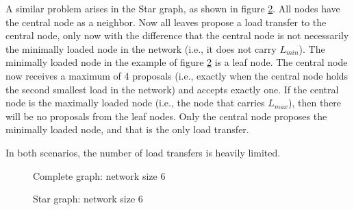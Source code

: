 A similar problem arises in the Star graph, as shown in figure \ref{fig:specialstargraphDemo}. All nodes have the central node as a neighbor. Now all leaves propose a load transfer to the central node, only now with the difference that the central node is not necessarily the minimally loaded node in the network (i.e., it does not carry $L_{min}$). The minimally loaded node in the example of figure \ref{fig:specialstargraphDemo} is a leaf node. The central node now receives a maximum of 4 proposals (i.e., exactly when the central node holds the second smallest load in the network) and accepts exactly one. If the central node is the maximally loaded node (i.e., the node that carries $L_{max}$), then there will be no proposals from the leaf nodes. Only the central node proposes the minimally loaded node, and that is the only load transfer.

In both scenarios, the number of load transfers is heavily limited.
\begin{figure}[]
    \centering
    \resizebox{0.3\linewidth}{!}{}
    \caption{Complete graph: network size 6}
    \label{fig:specialcompletegraphDemo}
\end{figure}
\begin{figure}[]
    \centering
    \resizebox{0.3\linewidth}{!}{}
    \caption{Star graph: network size 6}
    \label{fig:specialstargraphDemo}
\end{figure}
